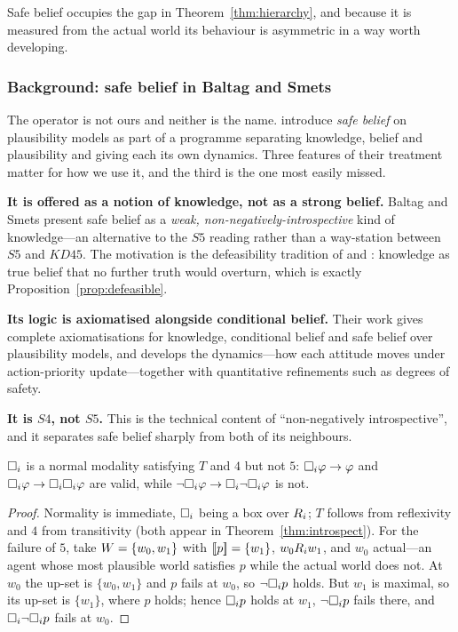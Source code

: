 \documentclass[11pt,a4paper]{article}
\begin{document}
Safe belief occupies the gap in Theorem~\ref{thm:hierarchy}, and because it is measured from the
actual world its behaviour is asymmetric in a way worth developing.

\subsubsection{Background: safe belief in Baltag and Smets}
\label{sec:bsbackground}

The operator is not ours and neither is the name. \citet{baltag2006,baltag2008} introduce
\emph{safe belief} on plausibility models as part of a programme separating knowledge, belief
and plausibility and giving each its own dynamics. Three features of their treatment matter
for how we use it, and the third is the one most easily missed.

\textbf{It is offered as a notion of knowledge, not as a strong belief.} Baltag and Smets
present safe belief as a \emph{weak, non-negatively-introspective} kind of knowledge---an
alternative to the $S5$ reading rather than a way-station between $S5$ and $KD45$. The
motivation is the defeasibility tradition of \citet{lehrer1969} and \citet{stalnaker2006}:
knowledge as true belief that no further truth would overturn, which is exactly
Proposition~\ref{prop:defeasible}.

\textbf{Its logic is axiomatised alongside conditional belief.} Their work gives complete
axiomatisations for knowledge, conditional belief and safe belief over plausibility models,
and develops the dynamics---how each attitude moves under action-priority update---together
with quantitative refinements such as degrees of safety.

\textbf{It is $S4$, not $S5$.} This is the technical content of ``non-negatively
introspective'', and it separates safe belief sharply from both of its neighbours.

\begin{proposition}
\label{prop:s4}
$\Box_{i}$ is a normal modality satisfying $T$ and $4$ but not $5$: $\Box_{i}\varphi \to
\varphi$ and $\Box_{i}\varphi \to \Box_{i}\Box_{i}\varphi$ are valid, while
$\neg\Box_{i}\varphi \to \Box_{i}\neg\Box_{i}\varphi$ is not.
\end{proposition}

\begin{proof}
Normality is immediate, $\Box_{i}$ being a box over $R_{i}$; $T$ follows from reflexivity
and $4$ from transitivity (both appear in Theorem~\ref{thm:introspect}). For the failure of
$5$, take $W = \{w_0, w_1\}$ with $[\![ p ]\!] = \{w_1\}$, $w_0 R_{i} w_1$, and
$w_0$ actual---an agent whose most plausible world satisfies $p$ while the actual world does
not. At $w_0$ the up-set is $\{w_0,w_1\}$ and $p$ fails at $w_0$, so $\neg\Box_{i}p$ holds.
But $w_1$ is maximal, so its up-set is $\{w_1\}$, where $p$ holds; hence $\Box_{i}p$ holds at
$w_1$, $\neg\Box_{i}p$ fails there, and $\Box_{i}\neg\Box_{i}p$ fails at $w_0$.
\end{proof}
\end{document}
